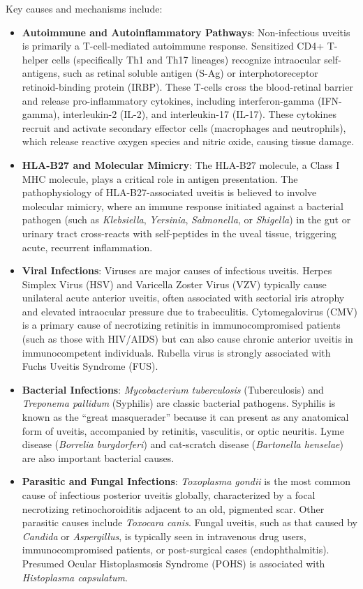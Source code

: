 Key causes and mechanisms include:
\begin{itemize}
    \item \textbf{Autoimmune and Autoinflammatory Pathways}: Non-infectious uveitis is primarily a T-cell-mediated autoimmune response. Sensitized CD4+ T-helper cells (specifically Th1 and Th17 lineages) recognize intraocular self-antigens, such as retinal soluble antigen (S-Ag) or interphotoreceptor retinoid-binding protein (IRBP). These T-cells cross the blood-retinal barrier and release pro-inflammatory cytokines, including interferon-gamma (IFN-gamma), interleukin-2 (IL-2), and interleukin-17 (IL-17). These cytokines recruit and activate secondary effector cells (macrophages and neutrophils), which release reactive oxygen species and nitric oxide, causing tissue damage.
    \item \textbf{HLA-B27 and Molecular Mimicry}: The HLA-B27 molecule, a Class I MHC molecule, plays a critical role in antigen presentation. The pathophysiology of HLA-B27-associated uveitis is believed to involve molecular mimicry, where an immune response initiated against a bacterial pathogen (such as \textit{Klebsiella}, \textit{Yersinia}, \textit{Salmonella}, or \textit{Shigella}) in the gut or urinary tract cross-reacts with self-peptides in the uveal tissue, triggering acute, recurrent inflammation.
    \item \textbf{Viral Infections}: Viruses are major causes of infectious uveitis. Herpes Simplex Virus (HSV) and Varicella Zoster Virus (VZV) typically cause unilateral acute anterior uveitis, often associated with sectorial iris atrophy and elevated intraocular pressure due to trabeculitis. Cytomegalovirus (CMV) is a primary cause of necrotizing retinitis in immunocompromised patients (such as those with HIV/AIDS) but can also cause chronic anterior uveitis in immunocompetent individuals. Rubella virus is strongly associated with Fuchs Uveitis Syndrome (FUS).
    \item \textbf{Bacterial Infections}: \textit{Mycobacterium tuberculosis} (Tuberculosis) and \textit{Treponema pallidum} (Syphilis) are classic bacterial pathogens. Syphilis is known as the ``great masquerader'' because it can present as any anatomical form of uveitis, accompanied by retinitis, vasculitis, or optic neuritis. Lyme disease (\textit{Borrelia burgdorferi}) and cat-scratch disease (\textit{Bartonella henselae}) are also important bacterial causes.
    \item \textbf{Parasitic and Fungal Infections}: \textit{Toxoplasma gondii} is the most common cause of infectious posterior uveitis globally, characterized by a focal necrotizing retinochoroiditis adjacent to an old, pigmented scar. Other parasitic causes include \textit{Toxocara canis}. Fungal uveitis, such as that caused by \textit{Candida} or \textit{Aspergillus}, is typically seen in intravenous drug users, immunocompromised patients, or post-surgical cases (endophthalmitis). Presumed Ocular Histoplasmosis Syndrome (POHS) is associated with \textit{Histoplasma capsulatum}.

\end{itemize}
